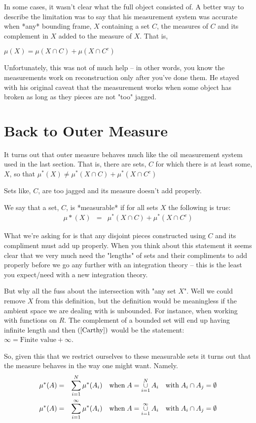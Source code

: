 \documentclass{article}
\begin{document}
In some cases, it wasn't clear what the full object consisted of. A better way 
to describe the limitation was to say that his measurement system was accurate 
when *any* bounding frame, $X$ containing a set $C$, the measures of $C$ and 
its complement in $X$ added to the measure of $X$. That is,

$\mu(X) = \mu(X \cap C) + \mu(X \cap C^c)$

Unfortunately, this was not of much help -- in other words, you know the 
measurements work on reconstruction only after you've done them.
He stayed with his original caveat that the measurement works when some object has 
broken as long as they pieces are not "too" jagged.


\section{Back to Outer Measure}
It turns out that outer measure behaves much like the oil measurement system 
used in the last section. That is, there are sets, $C$ for which there is at 
least some, $X$, so that
$\mu^*(X) \neq \mu^*(X \cap C) + \mu^*(X \cap C^c)$

Sets like, $C$, are too jagged and its measure doesn't add properly.

We say that a set, $C$, is *measurable*
if for all sets $X$ the following is true:
\begin{eqnarray}
	\mu*(X) & = & \mu^*(X \cap C) + \mu^*(X \cap C^c) \label{Carthy}
\end{eqnarray}

What we're asking for is that any disjoint pieces constructed using $C$ and 
its compliment must add up properly. When you think about this statement it
seems clear that we very much need the "lengths" of sets and their compliments
to add properly before we go any further with an integration theory -- this 
is the least you expect/need with a new integration theory.

But why all the fuss about the intersection with "any set $X$".
Well we could remove $X$ from this definition, but the definition would be 
meaningless if the ambient space we are dealing with is unbounded. For instance,
when working with functions on $R$. The complement of a bounded set will end 
up having infinite length and then $(\ref{Carthy})$ would be the statement: 
$\infty = \text{Finite value} + \infty$.
 
So, given this that we restrict ourselves to these measurable sets it turns out that
the measure behaves in the way one might want. Namely.
\begin{eqnarray*}
	\mu^*(A) & = & \sum_{i=1}^N\limits \mu^*(A_i) \quad \text{when} \; A = \mathop{\cup}_{i=1}^N\limits A_i \quad \text{with} \;  A_i \cap A_j = \emptyset \\
	\mu^*(A) & = & \sum_{i=1}^\infty\limits \mu^*(A_i) \quad \text{when} \; A = \mathop{\cup}_{i=1}^\infty\limits A_i \quad \text{with} \; A_i \cap A_j = \emptyset
\end{eqnarray*}
\end{document}
